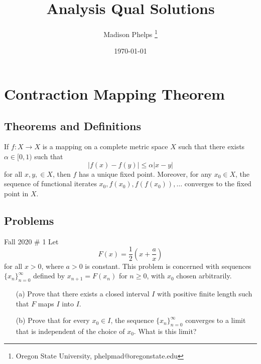 \documentclass{article}
\title{Analysis Qual Solutions}
\author{Madison Phelps \thanks{Oregon State University, phelpmad@oregonstate.edu}}
\date{\today}
\begin{document}
\maketitle

\thispagestyle{empty}

\break

\tableofcontents

\thispagestyle{empty}

\break



\section{Contraction Mapping Theorem}

\subsection{Theorems and Definitions}

\begin{theorem}\label{thm:banach-fixed-point}
	If $f: X\to X$ is a mapping on a complete metric space $X$ such that there exists $\alpha \in [0,1)$ such that 
	\[|f(x) - f(y)|\leq \alpha |x-y|\]
	for all $x,y,\in X$, then $f$ has a unique fixed point. Moreover, for any $x_0\in X$, the sequence of functional iterates 
	$x_0, f(x_0), f(f(x_0)),\dots$ converges to the fixed point in $X$. 
\end{theorem}

\break

\subsection{Problems}

\begin{problem}{Fall 2020 \# 1} Let 
	\[F(x) = \frac{1}{2}\left(x + \frac{a}{x}\right)\]
		for all $x>0$, where $a>0$ is constant. 
		This problem is concerned with sequences $\{x_n\}_{n=0}^\infty$ 
		defined by $x_{n+1} = F(x_n)$ for $n\geq 0$, with $x_0$ chosen arbitrarily.
	\begin{enumerate}
		\item[(a)] Prove that there exists a closed interval $I$ with positive finite length such that $F$ maps $I$ into $I$.
		
		\item[(b)] Prove that for every $x_0\in I$, the sequence $\{x_n\}_{n=0}^\infty$ converges to a limit 
			that is independent of the choice of $x_0$. What is this limit?
	\end{enumerate}
\end{problem}
\end{document}
